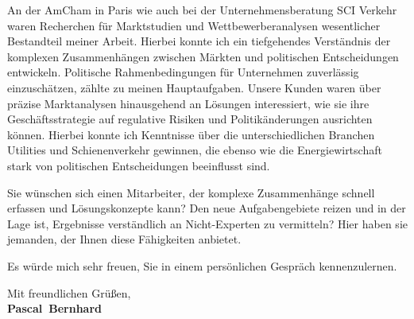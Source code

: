 \documentclass[11pt,a4paper]{article}
\def\firstname{Pascal}
\def\familyname{Bernhard}
\begin{document}
An der AmCham in Paris wie auch bei der Unternehmensberatung SCI Verkehr waren Recherchen für Marktstudien und Wettbewerberanalysen wesentlicher Bestandteil meiner Arbeit. Hierbei konnte ich ein tiefgehendes Verständnis der komplexen Zusammenhängen zwischen Märkten und politischen Entscheidungen entwickeln. Politische Rahmenbedingungen für Unternehmen zuverlässig einzuschätzen, zählte zu meinen Hauptaufgaben. Unsere Kunden waren über präzise Marktanalysen hinausgehend an Lösungen interessiert, wie sie ihre Geschäftsstrategie auf regulative Risiken und Politikänderungen ausrichten können. Hierbei konnte ich Kenntnisse über die unterschiedlichen Branchen Utilities und Schienenverkehr gewinnen, die ebenso wie die Energiewirtschaft stark von politischen Entscheidungen beeinflusst sind. 


Sie wünschen sich einen Mitarbeiter, der komplexe Zusammenhänge schnell erfassen und Lösungskonzepte kann? Den neue Aufgabengebiete reizen und in der Lage ist, Ergebnisse verständlich an Nicht-Experten zu vermitteln? Hier haben sie jemanden, der Ihnen diese Fähigkeiten anbietet.

Es würde mich sehr freuen, Sie in einem persönlichen Gespräch kennenzulernen.

  
Mit freundlichen Grüßen,\\[3em] %
%
{\bfseries \firstname~\familyname}\\
%
\end{document}
